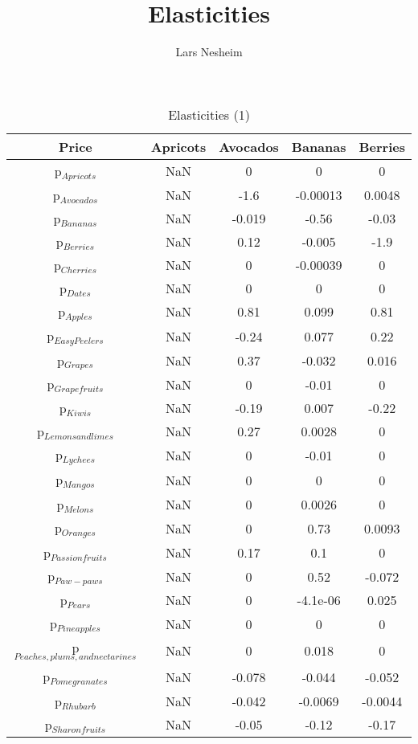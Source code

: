 \documentclass[11pt]{article}
\title{Elasticities}
\author{Lars Nesheim}
\date{}
\begin{document}
\maketitle
\begin{table}[h]
\caption{Elasticities (1)}
\label{Table: elasticities 1}
\begin{center}
\begin{tabular}{ccccc}
Price & Apricots & Avocados & Bananas & Berries \\ \hline
p$_{Apricots}$ & NaN & 0 & 0 & 0 \\ 
p$_{Avocados}$ & NaN & -1.6 & -0.00013 & 0.0048 \\ 
p$_{Bananas}$ & NaN & -0.019 & -0.56 & -0.03 \\ 
p$_{Berries}$ & NaN & 0.12 & -0.005 & -1.9 \\ 
p$_{Cherries}$ & NaN & 0 & -0.00039 & 0 \\ 
p$_{Dates}$ & NaN & 0 & 0 & 0 \\ 
p$_{Apples}$ & NaN & 0.81 & 0.099 & 0.81 \\ 
p$_{Easy Peelers}$ & NaN & -0.24 & 0.077 & 0.22 \\ 
p$_{Grapes}$ & NaN & 0.37 & -0.032 & 0.016 \\ 
p$_{Grapefruits}$ & NaN & 0 & -0.01 & 0 \\ 
p$_{Kiwis}$ & NaN & -0.19 & 0.007 & -0.22 \\ 
p$_{Lemons and limes}$ & NaN & 0.27 & 0.0028 & 0 \\ 
p$_{Lychees}$ & NaN & 0 & -0.01 & 0 \\ 
p$_{Mangos}$ & NaN & 0 & 0 & 0 \\ 
p$_{Melons}$ & NaN & 0 & 0.0026 & 0 \\ 
p$_{Oranges}$ & NaN & 0 & 0.73 & 0.0093 \\ 
p$_{Passion fruits}$ & NaN & 0.17 & 0.1 & 0 \\ 
p$_{Paw-paws}$ & NaN & 0 & 0.52 & -0.072 \\ 
p$_{Pears}$ & NaN & 0 & -4.1e-06 & 0.025 \\ 
p$_{Pineapples}$ & NaN & 0 & 0 & 0 \\ 
p$_{Peaches, plums, and nectarines}$ & NaN & 0 & 0.018 & 0 \\ 
p$_{Pomegranates}$ & NaN & -0.078 & -0.044 & -0.052 \\ 
p$_{Rhubarb}$ & NaN & -0.042 & -0.0069 & -0.0044 \\ 
p$_{Sharon fruits}$ & NaN & -0.05 & -0.12 & -0.17 \\ 
\end{tabular}
\end{center}
\end{table}
\end{document}
